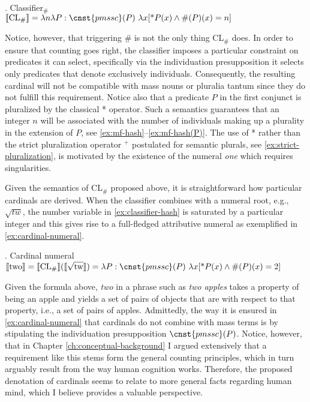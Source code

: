 	\ex. Classifier$_\#$\\
	$\llbracket \text{CL}_\#\rrbracket = \lambda n \lambda P : \cnst{pmssc}(P)\ \lambda x [\text{*}P(x) \wedge \#(P)(x) = n]$\label{ex:classifier-hash}
	
	Notice, however, that triggering $\#$ is not the only thing CL$_\#$ does. In order to ensure that counting goes right, the classifier imposes a particular constraint on predicates it can select, specifically via the individuation presupposition it selects only predicates that denote exclusively  individuals. Consequently, the resulting cardinal will not be compatible with mass nouns or pluralia tantum since they do not fulfill this requirement. Notice also that a predicate $P$ in the first conjunct is pluralized by the classical * operator. Such a semantics guarantees that an integer $n$ will be associated with the number of  individuals making up a plurality in the extension of $P$, see \ref{ex:mf-hash}--\ref{ex:mf-hash(P)}. The use of * rather than the strict pluralization operator ${}^+$ postulated for semantic plurals, see \ref{ex:strict-pluralization}, is motivated by the existence of the numeral \textit{one} which requires singularities.
	
	Given the semantics of CL$_\#$ proposed above, it is straightforward how particular cardinals are derived. When the classifier combines with a numeral root, e.g., $\sqrt{\textit{tw}}$, the number variable in \ref{ex:classifier-hash} is saturated by a particular integer and this gives rise to a full-fledged attributive numeral as exemplified in \ref{ex:cardinal-numeral}. 
	
	\ex. Cardinal numeral\\
	$\llbracket \text{two} \rrbracket = \llbracket \text{CL}_\# \rrbracket(\llbracket \sqrt{\text{tw}} \rrbracket) = \lambda P : \cnst{pmssc}(P)\ \lambda x [\text{*}P(x) \wedge \#(P)(x) = 2]$\label{ex:cardinal-numeral}
	
	Given the formula above, \textit{two} in a phrase such as \textit{two apples} takes a property of being an apple and yields a set of pairs of objects that are  with respect to that property, i.e., a set of pairs of apples. Admittedly, the way it is ensured in \ref{ex:cardinal-numeral} that cardinals do not combine with mass terms is by stipulating the individuation presupposition $\cnst{pmssc}(P)$. Notice, however, that in Chapter \ref{ch:conceptual-background} I argued extensively that a requirement like this stems form the general counting principles, which in turn arguably result from the way human cognition works. Therefore, the proposed denotation of cardinals seems to relate to more general facts regarding human mind, which I believe provides a valuable perspective. 
	
